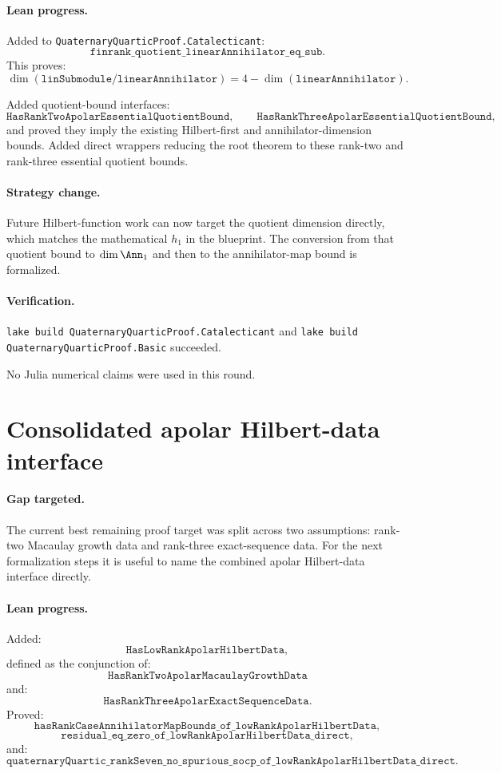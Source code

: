 \documentclass[11pt]{article}
\begin{document}
\paragraph{Lean progress.}
Added to \texttt{QuaternaryQuarticProof.Catalecticant}:
\[
\texttt{finrank\_quotient\_linearAnnihilator\_eq\_sub}.
\]
This proves:
\[
\dim(\texttt{linSubmodule}/\texttt{linearAnnihilator})
=4-\dim(\texttt{linearAnnihilator}).
\]

Added quotient-bound interfaces:
\[
\texttt{HasRankTwoApolarEssentialQuotientBound},
\qquad
\texttt{HasRankThreeApolarEssentialQuotientBound},
\]
and proved they imply the existing Hilbert-first and annihilator-dimension
bounds.  Added direct wrappers reducing the root theorem to these rank-two and
rank-three essential quotient bounds.

\paragraph{Strategy change.}
Future Hilbert-function work can now target the quotient dimension directly,
which matches the mathematical \(h_1\) in the blueprint.  The conversion from
that quotient bound to \(\dim\Ann_1\) and then to the annihilator-map bound is
formalized.

\paragraph{Verification.}
\texttt{lake build QuaternaryQuarticProof.Catalecticant} and
\texttt{lake build QuaternaryQuarticProof.Basic} succeeded.

No Julia numerical claims were used in this round.

\section*{Consolidated apolar Hilbert-data interface}

\paragraph{Gap targeted.}
The current best remaining proof target was split across two assumptions:
rank-two Macaulay growth data and rank-three exact-sequence data.  For the
next formalization steps it is useful to name the combined apolar Hilbert-data
interface directly.

\paragraph{Lean progress.}
Added:
\[
\texttt{HasLowRankApolarHilbertData},
\]
defined as the conjunction of:
\[
\texttt{HasRankTwoApolarMacaulayGrowthData}
\]
and:
\[
\texttt{HasRankThreeApolarExactSequenceData}.
\]
Proved:
\[
\texttt{hasRankCaseAnnihilatorMapBounds\_of\_lowRankApolarHilbertData},
\]
\[
\texttt{residual\_eq\_zero\_of\_lowRankApolarHilbertData\_direct},
\]
and:
\[
\texttt{quaternaryQuartic\_rankSeven\_no\_spurious\_socp\_of\_lowRankApolarHilbertData\_direct}.
\]
\end{document}
